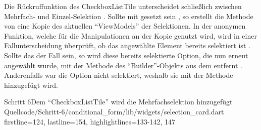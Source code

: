 Die Rückruffunktion  des CheckboxListTile unterscheidet schließlich zwischen Mehrfach- und Einzel-Selektion \Lst{\ref{lst:Schritt6CheckboxListTile}}.
Sollte  mit  gesetzt sein , so erstellt die Methode  von  eine Kopie des aktuellen \enquote{ViewModels} der Selektionen.
In der anonymen Funktion,
welche für die Manipulationen an der Kopie genutzt wird,
wird in einer Fallunterscheidung überprüft,
ob das angewählte Element bereits selektiert ist .
Sollte das der Fall sein,
so wird diese bereits selektierte Option, die nun erneut angewählt wurde, mit der Methode  des \enquote{Builder}-Objekts aus dem  entfernt .
Anderenfalls war die Option nicht selektiert, weshalb sie mit der Methode  hinzugefügt wird. 


\begin{alexlisting}{Schritt 6}{Dem \enquote{CheckboxListTile} wird die Mehrfachselektion hinzugefügt}
  {Quellcode/Schritt-6/conditional_form/lib/widgets/selection_card.dart}
  {firstline=124, lastline=154, highlightlines={133-142, 147}}
  \label{lst:Schritt6CheckboxListTile}
\end{alexlisting}